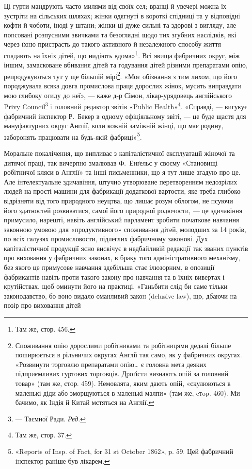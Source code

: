 \parcont{}  %
Ці гурти мандрують часто милями від своїх сел; вранці й увечері
можна їх зустріти на сільських шляхах; жінки одягнуті в короткі
спідниці та у відповідні кофти й чоботи, іноді у штани; жінки ці
дуже сильні та здорові з вигляду, але попсовані розпусними
звичками та безоглядні щодо тих згубних наслідків, які через
їхню пристрасть до такого активного й незалежного способу
життя спадають на їхніх дітей, що нидіють вдома»\footnote{
Там же, стор. 456.
}. Всі явища
фабричних округ, між іншим, замасковане вбивання дітей та
годування дітей різними препаратами опію, репродукуються тут
у ще більшій мірі\footnote{
Споживання опію дорослими робітниками та робітницями дедалі
більше поширюється в рільничих округах Англії так само, як у фабричних
округах. «Розвинути торговлю препаратами опію\dots{} є головна мета
деяких підприємливих гуртових торговців. Дроґісти визнають опій за
головний товар» (там же, стор. 459). Немовлята, яким дають опій, «скулюються
в маленькі діди або зморщуються в маленькі малпи» (там же,
cтop. 460). Ми бачимо, як Індія й Китай мстяться на Англії.
}. «Моє обізнання з тим лихом, що його породжувала
всяка довга промислова праця дорослих жінок, мусить
виправдати мою глибоку огиду до неї», — каже д-р Сімон,
лікар-урядовець англійського Privy Council\footnote*{
— Таємної Ради. \emph{Ред.}
} і головний редактор
звітів «Public Health»\footnote{
Там же, стор. 37.
}. «Справді, — вигукує фабричний
інспектор Р.~Бекер в одному офіціяльному звіті, — це буде
щастя для мануфактурних округ Англії, коли кожній заміжній
жінці, що має родину, заборонять працювати на будь-якій
фабриці»\footnote{
«Reports of Insp. of Fact, for 31 st October 1862», p. 59. Цей фабричний
інспектор раніше був лікарем.
}.

Моральне покалічення, що випливає з капіталістичної експлуатації
жіночої та дитячої праці, так вичерпно змалював Ф.~Енґельс
у своєму «Становищі робітничої кляси в Англії» та інші письменники,
що я тут лише згадую про це. Але інтелектуальне здичавіння,
штучно утворюване перетворенням недозрілих людей на
прості машини для фабрикації додаткової вартости, яке треба
глибоко відрізняти від того природного неуцтва, що лишає розум
облогом, не псуючи його здатностей розвиватися, самої його природної
родючости, — це здичавіння примусило, нарешті, навіть
англійський парламент зробити початкове навчання законною
умовою для «продуктивного» споживання дітей, молодших за
14 років, по всіх галузях промисловости, підлеглих фабричному
законові. Дух капіталістичної продукції ясно висвічує в недбайливій
редакції так званих пунктів про виховання у фабричних
законах, в браку того адміністративного механізму, без якого це
примусове навчання здебільша стає ілюзорним, в опозиції фабрикантів
навіть проти такого закону про навчання та в їхніх вивертах
і крутійствах, щоб оминути його на практиці. «Ганьбити
слід би саме тільки законодавство, бо воно видало оманливий
закон (delusive law), що, дбаючи на позір про виховання дітей
\parbreak{}  %
